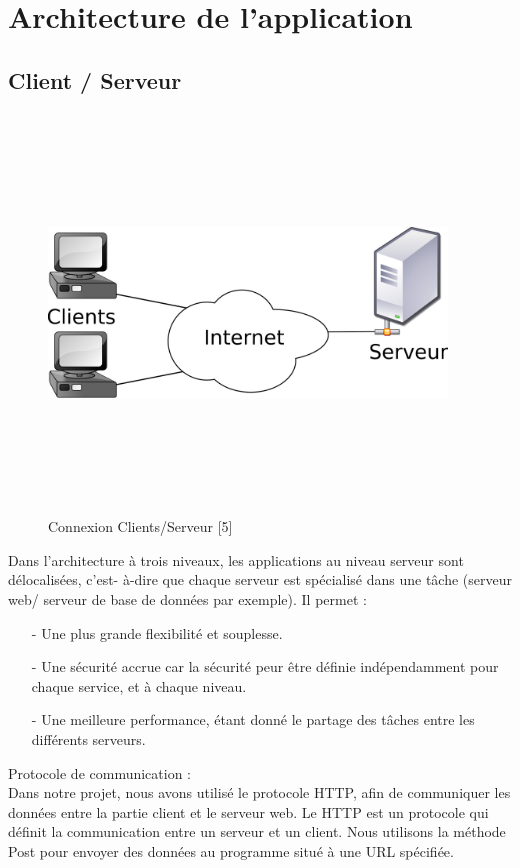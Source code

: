 \documentclass[11.5pt]{report}
\begin{document}
\section{Architecture de l’application }
\subsection{Client / Serveur }
\begin{figure}[h]
	
	\begin{center}
		\includegraphics[width=300pt,height=300pt]{clientserveur.png} 
		\caption{Connexion Clients/Serveur [5]}
	\end{center}
	
\end{figure}
\newpage
Dans l’architecture à trois niveaux, les applications au niveau serveur sont délocalisées, c’est- à-dire que chaque serveur est spécialisé dans une tâche (serveur web/ serveur de base de données par exemple).
Il permet :\\
\begin{itemize}
	\item [-] Une plus grande flexibilité et souplesse. 
	\item [-] Une sécurité accrue car la sécurité peur être définie indépendamment pour chaque service, et à chaque niveau. 
	\item [-] Une meilleure performance, étant donné le partage des tâches entre les différents serveurs.\\
\end{itemize}
Protocole de communication :\\
Dans notre projet, nous avons utilisé le protocole HTTP, afin de communiquer les données entre la partie client et le serveur web. Le HTTP est un protocole qui définit la communication entre un serveur et un client. Nous utilisons la méthode Post pour envoyer des données au programme situé à une URL spécifiée.
\end{document}
